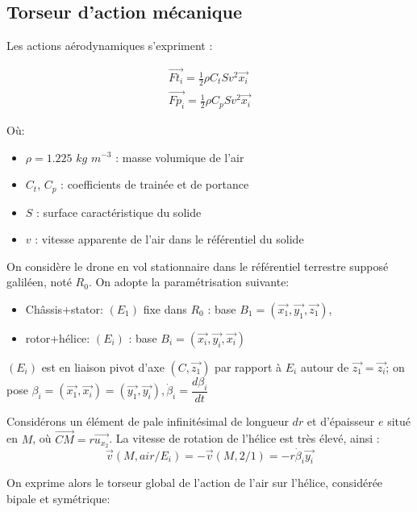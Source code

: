\documentclass[10pt,a4paper]{article}
\begin{document}
\subsection{Torseur d'action mécanique}

Les actions aérodynamiques s'expriment :

\begin{eqnarray}
\vec{Ft_{i}} = \frac{1}{2} \rho C_{t} S v^2 \vec{x_{i}} \\
\vec{Fp_{i}} = \frac{1}{2} \rho C_{p} S v^2 \vec{x_{i}}
\end{eqnarray}

Où:

\begin{itemize}
\item $\rho = 1.225$ $kg$ $m^{-3}$ : masse volumique de l'air
\item $C_{t}$, $C_{p}$ : coefficients de trainée et de portance
\item $S$ : surface caractéristique du solide
\item $v$ : vitesse apparente de l'air dans le référentiel du solide
\end{itemize} 

On considère le drone en vol stationnaire dans le référentiel terrestre supposé galiléen, noté $R_{0}$. On adopte la paramétrisation suivante: 

\begin{itemize}
\item Châssis+stator: $(E_{1})$ fixe dans $R_{0}$ : base $B_{1} = 
( \vec{x_{1}} , \vec{y_{1}} , \vec{z_{1}} )$,
\item rotor+hélice: $(E_{i})$ : base $ B_{i} = 
( \vec{x_{i}} , \vec{y_{i}} , \vec{x_{i}})$
\end{itemize}

$(E_{i})$ est en liaison pivot d'axe $(C,\vec{z_{1}})$ par rapport à $E_{i}$ autour de $ \vec{z_{1}} = \vec{z_{i}}$;
on pose $ \beta_{i} = (\vec{x_{1}},\vec{x_{i}}) = (\vec{y_{1}},\vec{y_{i}}),
\dot \beta_{i} = \dfrac{d\beta_{i}}{dt}$

Considérons un élément de pale infinitésimal de longueur $dr$ et d'épaisseur $e$ situé en $M$, où $ \vec{CM}=r \vec{u_{x_{2}}} $.
La vitesse de rotation de l'hélice est très élevé, ainsi :
 \\
$$ \vec{v}(M,air/E_{i}) = -\vec{v}(M,2/1) = -r \dot \beta_{i} \vec{y_{i}}$$

On exprime alors le torseur global de l'action de l'air sur l'hélice, considérée bipale et symétrique:
\end{document}
